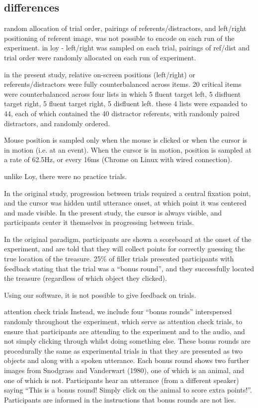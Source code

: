 \documentclass[a4paper,man,natbib]{apa6}
\begin{document}
\subsection*{differences}

random allocation of trial order, pairings of referents/distractors, and left/right positioning of referent image, was not possible to encode on each run of the experiment. 
in loy - left/right was sampled on each trial, pairings of ref/dist and trial order were randomly allocated on each run of experiment.  

in the present study, relative on-screen positions (left/right) or referents/distractors were fully counterbalanced across items.
20 critical items were counterbalanced across four lists in which 5 fluent target left, 5 disfluent target right, 5 fluent target right, 5 disfluent left. 
these 4 lists were expanded to 44, each of which contained the 40 distractor referents, with randomly paired distractors, and randomly ordered. 

Mouse position is sampled only when the mouse is clicked or when the cursor is in motion (i.e. at an event). 
When the cursor is in motion, position is sampled at a rate of 62.5Hz, or every 16ms (Chrome on Linux with wired connection).

unlike Loy, there were no practice trials.  

In the original study, progression between trials required a central fixation point, and the cursor was hidden until utterance onset, at which point it was centered and made visible.
In the present study, the cursor is always visible, and participants center it themselves in progressing between trials. 

In the original paradigm, participants are shown a scoreboard at the onset of the experiment, and are told that they will collect points for correctly guessing the true location of the treasure. 25\% of filler trials presented participants with feedback stating that the trial was a “bonus round”, and they successfully located the treasure (regardless of which object they clicked).

Using our software, it is not possible to give feedback on trials. 

attention check trials  
Instead, we include four “bonus rounds” interspersed randomly throughout the experiment, which serve as attention check trials, to ensure that participants are attending to the experiment and to the audio, and not simply clicking through whilst doing something else.  
These bonus rounds are procedurally the same as experimental trials in that they are presented as two objects and along with a spoken utterance. 
Each bonus round shows two further images from Snodgrass and Vanderwart (1980), one of which is an animal, and one of which is not. Participants hear an utterance (from a different speaker) saying “This is a bonus round! Simply click on the animal to score extra points!”. 
Participants are informed in the instructions that bonus rounds are not lies. 
\end{document}
